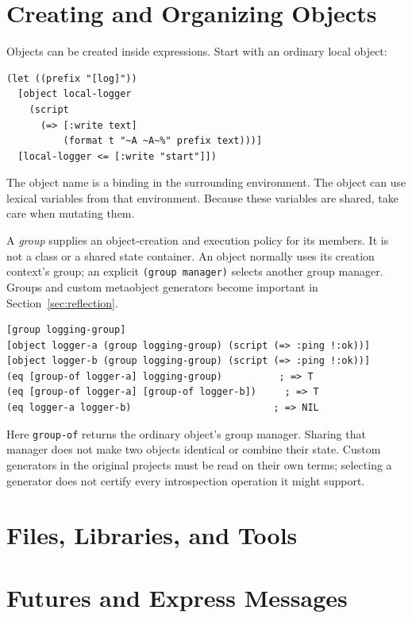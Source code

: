 \documentclass[11pt,a4paper]{article}
\newcommand{\code}[1]{\texttt{#1}}
\begin{document}
\section{Creating and Organizing Objects}

Objects can be created inside expressions. Start with an ordinary local object:

\begin{lstlisting}
(let ((prefix "[log]"))
  [object local-logger
    (script
      (=> [:write text]
          (format t "~A ~A~%" prefix text)))]
  [local-logger <= [:write "start"]])
\end{lstlisting}

The object name is a binding in the surrounding environment.
The object can use lexical variables from that environment.
Because these variables are shared, take care when mutating them.

A \emph{group} supplies an object-creation and execution policy for its
members. It is not a class or a shared state container.
An object normally uses its creation context's group; an explicit
\code{(group manager)} selects another group manager. Groups and custom
metaobject generators become important in Section~\ref{sec:reflection}.

\begin{lstlisting}
[group logging-group]
[object logger-a (group logging-group) (script (=> :ping !:ok))]
[object logger-b (group logging-group) (script (=> :ping !:ok))]
(eq [group-of logger-a] logging-group)          ; => T
(eq [group-of logger-a] [group-of logger-b])     ; => T
(eq logger-a logger-b)                         ; => NIL
\end{lstlisting}
Here \code{group-of} returns the ordinary object's group manager.
Sharing that manager does not make two objects identical or combine
their state. Custom generators in the original projects must be read
on their own terms; selecting a generator does not certify every
introspection operation it might support.

\section{Files, Libraries, and Tools}
\label{sec:files}


\section{Futures and Express Messages}
\label{sec:message-extensions}
\end{document}
